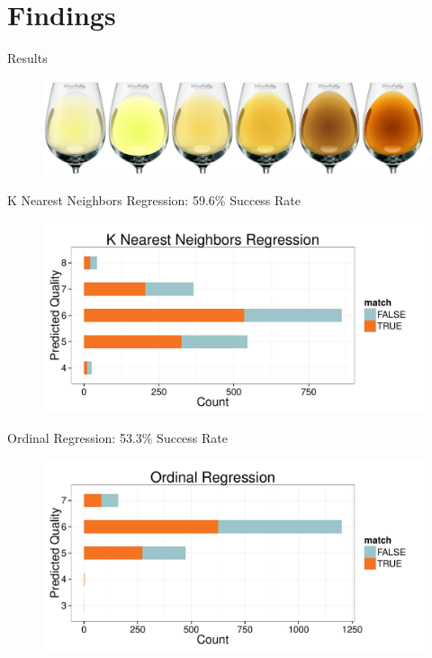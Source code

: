 \documentclass{beamer}
\begin{document}
\section{Findings}
\begin{frame}{Results}
	\begin{figure}
		\centering
		\includegraphics[width=\textwidth]{../images/gradient.jpg}
	\end{figure}
\end{frame}



\begin{frame}{K Nearest Neighbors Regression: 59.6\% Success Rate}
	\begin{figure}
		\centering
		\includegraphics[width=\textwidth]{../images/KNNRegression_Results.pdf}
	\end{figure}

\end{frame}


\begin{frame}{Ordinal Regression: 53.3\% Success Rate}
	\begin{figure}
		\centering
		\includegraphics[width=\textwidth]{../images/OrdinalRegression_Results.pdf}
	\end{figure}

\end{frame}
\end{document}
